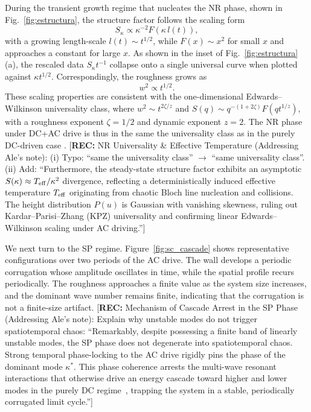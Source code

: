 \documentclass[prb,aps,twocolumn,superscriptaddress,floatfix]{revtex4-1}
\newcommand{\rec}[1]{{\color{magenta}[\textbf{REC:} #1]}}
\begin{document}
During the transient growth regime that nucleates the NR phase, 
shown in Fig.~\ref{fig:estructura},
the structure factor follows the scaling form
\begin{equation}
S_\kappa \propto \kappa^{-2}F(\kappa \, l(t)),
\end{equation}
with a growing length-scale $l(t)\sim t^{1/2}$, while $F(x)\sim x^2$ for small $x$ and approaches a constant for large $x$.
As shown in the inset of Fig.~\ref{fig:estructura}(a), the rescaled data $S_\kappa t^{-1}$ collapse onto a single universal curve when plotted against $\kappa t^{1/2}$.
Correspondingly, the roughness grows as
\begin{equation}
w^2 \propto t^{1/2}.
\end{equation}
These scaling properties are consistent with the one-dimensional Edwards--Wilkinson universality class, where $w^2 \sim t^{2\zeta/z}$ and $S(q)\sim q^{-(1+2\zeta)}F(q t^{1/z})$, with a roughness exponent $\zeta=1/2$ and dynamic exponent $z=2$. The NR phase under DC+AC drive is thus in the same the universality class as in the purely DC-driven case \cite{pusiol2026deterministic}.
\rec{NR Universality \& Effective Temperature (Addressing Ale's note): (i) Typo: ``same the universality class'' $\to$ ``same universality class''. (ii) Add: ``Furthermore, the steady-state structure factor exhibits an asymptotic $S(\kappa) \approx T_{\rm eff} / \kappa^2$ divergence, reflecting a deterministically induced effective temperature $T_{\rm eff}$ originating from chaotic Bloch line nucleation and collisions. The height distribution $P(u)$ is Gaussian with vanishing skewness, ruling out Kardar--Parisi--Zhang (KPZ) universality and confirming linear Edwards--Wilkinson scaling under AC driving.''}

We next turn to the SP regime. Figure~\ref{fig:sc_cascade} shows representative configurations over two periods of the AC drive. The wall develops a periodic corrugation whose amplitude oscillates in time, while the spatial profile recurs periodically. The roughness approaches a finite value as the system size increases, and the dominant wave number remains finite, indicating that the corrugation is not a finite-size artifact. 
\rec{Mechanism of Cascade Arrest in the SP Phase (Addressing Ale's note): Explain why unstable modes do not trigger spatiotemporal chaos: ``Remarkably, despite possessing a finite band of linearly unstable modes, the SP phase does not degenerate into spatiotemporal chaos. Strong temporal phase-locking to the AC drive rigidly pins the phase of the dominant mode $\kappa^*$. This phase coherence arrests the multi-wave resonant interactions that otherwise drive an energy cascade toward higher and lower modes in the purely DC regime~\cite{pusiol2026deterministic}, trapping the system in a stable, periodically corrugated limit cycle.''} 
\end{document}
